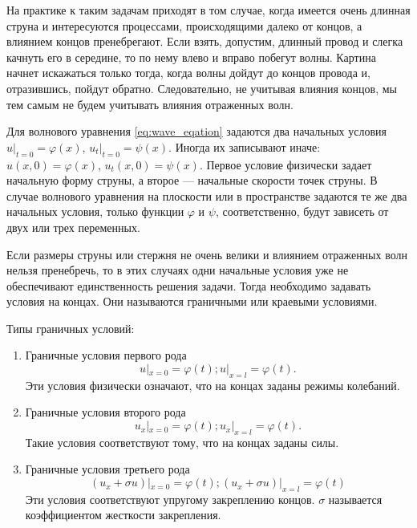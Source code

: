 \documentclass[12pt,a4paper,russian]{report}
\begin{document}
	На практике к таким задачам приходят в том случае, когда имеется очень длинная струна и интересуются процессами, происходящими далеко от концов, а влиянием концов пренебрегают. Если взять, допустим, длинный провод и слегка качнуть его в середине, то по нему влево и вправо побегут волны. Картина начнет искажаться только тогда, когда волны дойдут до концов провода и, отразившись, пойдут обратно. Следовательно, не учитывая влияния концов, мы тем самым не будем учитывать влияния отраженных волн.
	
	Для волнового уравнения \eqref{eq:wave_eqation} задаются два начальных условия $u|_{t=0} = \varphi (x)$, $u_t|_{t=0} = \psi (x)$. Иногда их записывают иначе: $u(x, 0) = \varphi (x)$, $u_t(x, 0) = \psi (x)$. Первое условие физически задает начальную форму струны, а второе --- начальные скорости точек струны. 
	В случае волнового уравнения  на плоскости или в пространстве задаются те же два начальных условия, только функции $\varphi$ и $\psi$, соответственно, будут зависеть от двух или трех переменных.
	
	Если размеры струны или стержня не очень велики и влиянием отраженных волн нельзя пренебречь, то в этих случаях одни начальные условия уже не обеспечивают единственность решения задачи. Тогда необходимо задавать условия на концах. Они называются граничными или краевыми условиями. 

	Типы граничных условий:
		
	\begin{enumerate}
		\item Граничные условия первого рода \\
		\begin{equation*}
			u|_{x = 0} = \varphi (t); u|_{x = l} = \varphi (t).
		\end{equation*}
		Эти условия физически означают, что на концах заданы режимы колебаний.
		
		\item Граничные условия второго рода \\
		\begin{equation*}
			u_x|_{x = 0} = \varphi (t); u_x|_{x = l} = \varphi (t).
		\end{equation*}
		Такие условия соответствуют тому, что на концах заданы силы.
		
		\item Граничные условия третьего рода \\
		\begin{equation*}
			\left( u_x + \sigma u \right) |_{x = 0} =  \varphi (t);
			\left( u_x + \sigma u \right) |_{x = l} =  \varphi (t)
		\end{equation*}
		Эти условия соответствуют упругому закреплению концов.
		$\sigma$ называется коэффициентом жесткости закрепления.
	\end{enumerate}
\end{document}
